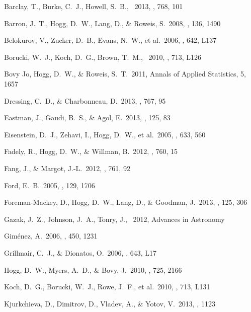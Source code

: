 \documentclass[letterpaper,12pt,preprint]{hack_aastex}
\begin{document}
\clearpage
\begin{thebibliography}{}\raggedright%

Barclay, T., Burke, C.~J., Howell, S.~B., \etal\ 2013, \apj, {768}, 101

Barron, J.~T., Hogg, D.~W., Lang, D., \& Roweis, S.\ 2008, \aj, 136, 1490

Belokurov, V., Zucker, D.~B., Evans, N.~W., et al.\ 2006, \apjl, 642, L137

Borucki, W.~J., Koch, D.~G., Brown, T.~M., \etal\ 2010, \apjl, {713}, L126

Bovy Jo, Hogg, D.~W., \& Roweis, S.~T.\ 2011, Annals of Applied Statistics,
5, 1657

Dressing, C.~D., \& Charbonneau, D.\ 2013, \apj, {767}, 95

Eastman, J., Gaudi, B.~S., \& Agol, E.\ 2013, \pasp, {125}, 83

Eisenstein, D.~J., Zehavi, I., Hogg, D.~W., et al.\ 2005, \apj, 633, 560

Fadely, R., Hogg, D.~W., \& Willman, B.\ 2012, \apj, 760, 15

Fang, J., \& Margot, J.-L.\ 2012, \apj, 761, 92

Ford, E.~B.\ 2005, \aj, {129}, 1706

Foreman-Mackey, D., Hogg, D.~W., Lang, D., \& Goodman, J.\ 2013,
\pasp, {125}, 306

Gazak, J.~Z., Johnson, J.~A., Tonry, J., \etal\ 2012, Advances in Astronomy

Gim{\'e}nez, A.\ 2006, \aap, {450}, 1231

Grillmair, C.~J., \& Dionatos, O.\ 2006, \apjl, 643, L17

Hogg, D.~W., Myers, A.~D., \& Bovy, J.\ 2010, \apj, 725, 2166

Koch, D.~G., Borucki, W.~J., Rowe, J.~F., et al.\ 2010, \apjl,
713, L131

Kjurkchieva, D., Dimitrov, D., Vladev, A., \& Yotov, V.\ 2013, \mnras,
1123


\end{thebibliography}
\end{document}
